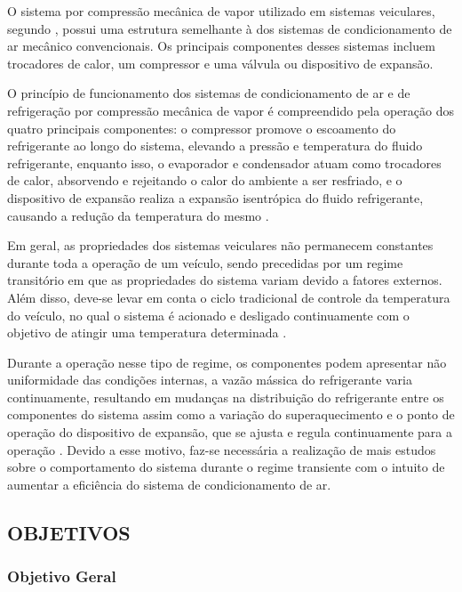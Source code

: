 O sistema por compressão mecânica de vapor utilizado em sistemas veiculares, segundo  \textcite{dasilva2016}, possui uma estrutura semelhante à dos sistemas de condicionamento de ar mecânico convencionais. Os principais componentes desses sistemas incluem trocadores de calor, um compressor e uma válvula ou dispositivo de expansão.

O princípio de funcionamento dos sistemas de condicionamento de ar e de refrigeração por compressão mecânica de vapor é compreendido pela operação dos quatro principais componentes: o compressor promove o escoamento do refrigerante ao longo do sistema, elevando a pressão e temperatura do fluido refrigerante, enquanto isso, o evaporador e condensador atuam como trocadores de calor, absorvendo e rejeitando o calor do ambiente a ser resfriado, e o dispositivo de expansão realiza a expansão isentrópica do fluido refrigerante, causando a redução da temperatura do mesmo \cite{junior2023}.

Em geral, as propriedades dos sistemas veiculares não permanecem constantes durante toda a operação de um veículo, sendo precedidas por um regime transitório em que as propriedades do sistema variam devido a fatores externos. Além disso, deve-se levar em conta o ciclo tradicional de controle da temperatura do veículo, no qual o sistema é acionado e desligado continuamente com o objetivo de atingir uma temperatura determinada \cite{juliani2017}.

Durante a operação nesse tipo de regime, os componentes podem apresentar não uniformidade das condições internas, a vazão mássica do refrigerante varia continuamente, resultando em mudanças na distribuição do refrigerante entre os componentes do sistema assim como a variação do superaquecimento e o ponto de operação do dispositivo de expansão, que se ajusta e regula continuamente para a operação \cite{rangel2007}. Devido a esse motivo, faz-se necessária a realização de mais estudos sobre o comportamento do sistema durante o regime transiente com o intuito de aumentar a eficiência do sistema de condicionamento de ar.

\subsection{OBJETIVOS}

\subsubsection{Objetivo Geral}

